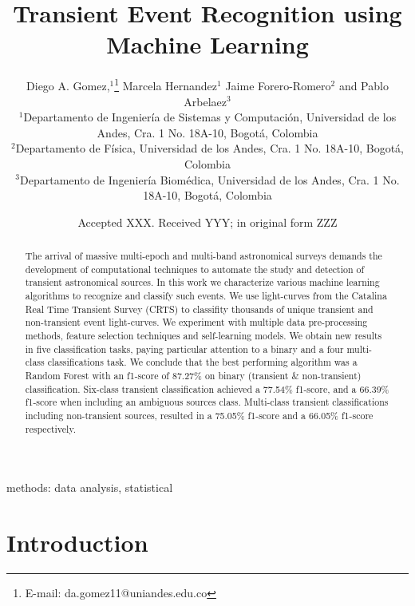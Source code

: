 \documentclass[a4paper,fleqn,usenatbib]{mnras}
\title[Transient Event Recognition using Machine Learning]{Transient Event Recognition using Machine Learning}
\author[Diego. A. Gomez et al.]{
Diego A. Gomez,$^{1}$\thanks{E-mail: da.gomez11@uniandes.edu.co}
Marcela Hernandez$^{1}$   
Jaime Forero-Romero$^{2}$
and Pablo Arbelaez$^{3}$
\\
$^{1}$Departamento de Ingenier\'ia de Sistemas y Computaci\'on, Universidad de los Andes, Cra. 1 No. 18A-10, Bogot\'a, Colombia\\
$^{2}$Departamento de F\'isica, Universidad de los Andes, Cra. 1 No. 18A-10, Bogot\'a, Colombia\\
$^{3}$Departamento de Ingenier\'ia Biom\'edica, Universidad de los Andes, Cra. 1 No. 18A-10, Bogot\'a, Colombia
}
\date{Accepted XXX. Received YYY; in original form ZZZ}
\begin{document}
\label{firstpage}
\pagerange{\pageref{firstpage}--\pageref{lastpage}}
\maketitle

\begin{abstract}




The arrival of massive multi-epoch and multi-band astronomical surveys
demands the development of computational techniques to automate the
study and detection of transient astronomical sources. 
In this work we characterize various machine learning algorithms to
recognize and classify such events.
We use light-curves from the Catalina Real Time Transient Survey
(CRTS) to classifity thousands of unique transient and non-transient
event light-curves.
We experiment  with multiple data pre-processing methods,
feature selection techniques and self-learning models. 
We obtain new results in five classification tasks, paying particular
attention to a binary and a four multi-class classifications task.  
We conclude that the best performing algorithm was
a Random Forest with an f1-score of 87.27\% on binary
(transient \& non-transient) classification. 
Six-class transient classification achieved a 77.54\% f1-score, and a
66.39\% f1-score when including an ambiguous sources class.
Multi-class transient classifications including non-transient sources,
resulted in a 75.05\% f1-score and a 66.05\% f1-score respectively.  

\end{abstract}

\begin{keywords}
methods: data analysis, statistical
\end{keywords}



\section{Introduction}
\end{document}
